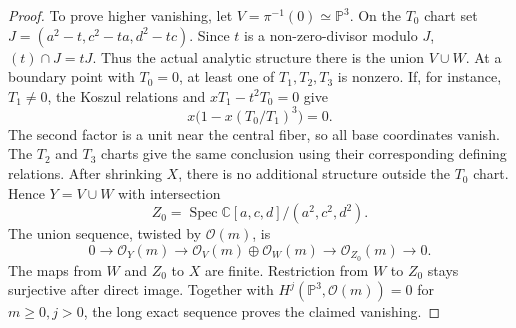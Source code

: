 \documentclass[11pt,reqno]{amsart}
\numberwithin{equation}{section}
\theoremstyle{definition}
\theoremstyle{remark}
\newcommand{\OO}{\mathcal O}
\newcommand{\PP}{\mathbb P}
\newcommand{\CC}{\mathbb C}
\begin{document}
\begin{proof}
To prove higher vanishing, let $V=\pi^{-1}(0)\simeq\PP^3$. On the $T_0$ chart set $J=(a^2-t,c^2-ta,d^2-tc)$. Since $t$ is a non-zero-divisor modulo $J$, $(t)\cap J=tJ$. Thus the actual analytic structure there is the union $V\cup W$. At a boundary point with $T_0=0$, at least one of $T_1,T_2,T_3$ is nonzero. If, for instance, $T_1\neq0$, the Koszul relations and $xT_1-t^2T_0=0$ give
\[
 x\bigl(1-x(T_0/T_1)^3\bigr)=0.
\]
The second factor is a unit near the central fiber, so all base coordinates vanish. The $T_2$ and $T_3$ charts give the same conclusion using their corresponding defining relations. After shrinking $X$, there is no additional structure outside the $T_0$ chart. Hence $Y=V\cup W$ with intersection
\[
 Z_0=\operatorname{Spec}\CC[a,c,d]/(a^2,c^2,d^2).
\]
The union sequence, twisted by $\OO(m)$, is
\[
 0\to\OO_Y(m)\to\OO_V(m)\oplus\OO_W(m)\to\OO_{Z_0}(m)\to0.
\]
The maps from $W$ and $Z_0$ to $X$ are finite. Restriction from $W$ to $Z_0$ stays surjective after direct image. Together with $H^j(\PP^3,\OO(m))=0$ for $m\geq0,j>0$, the long exact sequence proves the claimed vanishing.
\end{proof}
\end{document}
